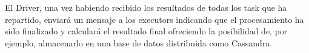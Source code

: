 El Driver, una vez habiendo recibido los resultados de todas los task que ha repartido, enviará un mensaje a los executors indicando que el procesamiento ha sido finalizado y calculará el resultado final ofreciendo la posibilidad de, por ejemplo, almacenarlo en una base de datos distribuida como Cassandra.\\






